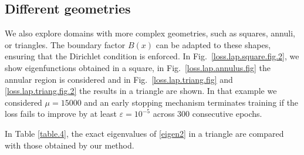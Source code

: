 \documentclass[11pt]{amsart}
\theoremstyle{definition}
\theoremstyle{remark}
\theoremstyle{plain}
\begin{document}












\subsection{Different geometries}
We also explore domains with more complex geometries, such as squares, annuli, or triangles. The boundary factor $B(x)$ can be adapted to these shapes, ensuring that the Dirichlet condition is enforced. In Fig.~\ref{loss.lap.square.fig.2}, we show eigenfunctions obtained in a square, in Fig.~\ref{loss.lap.annulus.fig}  the annular region is considered and in Fig.~\ref{loss.lap.triang.fig} and \ref{loss.lap.triang.fig.2} the results in a triangle are shown.   In that example we considered $\mu=15000$ and an early stopping mechanism terminates training if the loss fails to improve by at least $\varepsilon =10^{-5}$ across 300 consecutive epochs.

In Table \ref{table.4},  the exact eigenvalues of \eqref{eigen2} in a triangle are compared with those obtained by our method.

\end{document}
